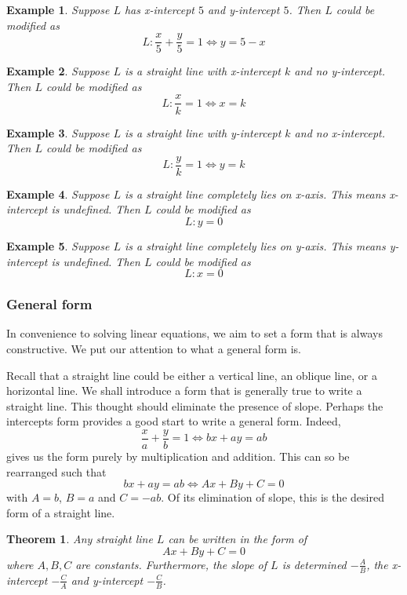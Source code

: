 \documentclass[12pt]{article}
\newtheorem*{theorem}{Theorem}
\newtheorem*{example}{Example}
\begin{document}
    \begin{example}
        Suppose $L$ has x-intercept $5$ and y-intercept $5$. Then $L$ could be modified as $$L:\frac{x}{5}+\frac{y}{5}=1\iff y=5-x$$
    \end{example}
    
    \begin{example}
        Suppose $L$ is a straight line with x-intercept $k$ and no y-intercept. Then $L$ could be modified as $$L:\frac{x}{k}=1\iff x=k$$
    \end{example}
    
    \begin{example}
        Suppose $L$ is a straight line with y-intercept $k$ and no x-intercept. Then $L$ could be modified as $$L:\frac{y}{k}=1\iff y=k$$
    \end{example}
    
    \begin{example}
        Suppose $L$ is a straight line completely lies on x-axis. This means x-intercept is undefined. Then $L$ could be modified as $$L:y=0$$
    \end{example}
    
    \begin{example}
        Suppose $L$ is a straight line completely lies on y-axis. This means y-intercept is undefined. Then $L$ could be modified as $$L:x=0$$
    \end{example}

    \subsubsection{General form}

    In convenience to solving linear equations, we aim to set a form that is always constructive. We put our attention to what a general form is.

    Recall that a straight line could be either a vertical line, an oblique line, or a horizontal line. We shall introduce a form that is generally true to write a straight line. This thought should eliminate the presence of slope. Perhaps the intercepts form provides a good start to write a general form. Indeed, $$\frac{x}{a}+\frac{y}{b}=1 \iff bx+ay=ab$$ gives us the form purely by multiplication and addition. This can so be rearranged such that $$bx+ay=ab\iff Ax+By+C=0$$ with $A=b$, $B=a$ and $C=-ab$. Of its elimination of slope, this is the desired form of a straight line.

    \begin{theorem}
        Any straight line $L$ can be written in the form of $$Ax+By+C=0$$ where $A,B,C$ are constants. Furthermore, the slope of $L$ is determined $-\frac{A}{B}$, the x-intercept $-\frac{C}{A}$ and y-intercept $-\frac{C}{B}$.
    \end{theorem}
\end{document}
